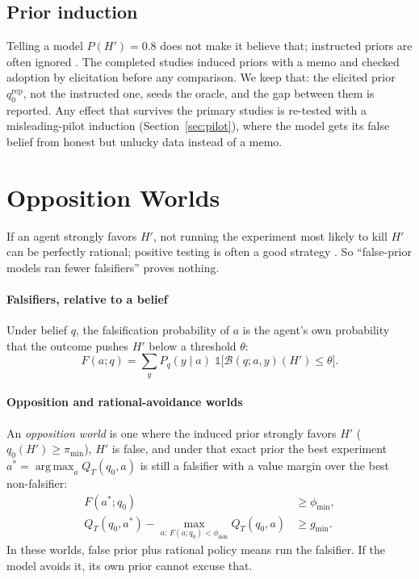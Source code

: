 \documentclass[10pt,letterpaper,twocolumn]{article}
\newcommand{\rep}{\mathrm{rep}}
\newcommand{\Ind}{\mathbb{1}}
\newcommand{\Bop}{\mathcal{B}}
\DeclareMathOperator*{\argmax}{arg\,max}
\begin{document}
\subsection{Prior induction}
\label{sec:induction}
Telling a model $P(H') = 0.8$ does not make it believe that; instructed priors are often ignored \citep{gupta2025coinflips}. The completed studies induced priors with a memo and checked adoption by elicitation before any comparison. We keep that: the elicited prior $q_0^{\rep}$, not the instructed one, seeds the oracle, and the gap between them is reported. Any effect that survives the primary studies is re-tested with a misleading-pilot induction (Section~\ref{sec:pilot}), where the model gets its false belief from honest but unlucky data instead of a memo.

\section{Opposition Worlds}
\label{sec:opposition}

If an agent strongly favors $H'$, not running the experiment most likely to kill $H'$ can be perfectly rational; positive testing is often a good strategy \citep{klayman1987confirmation}. So ``false-prior models ran fewer falsifiers'' proves nothing.

\paragraph{Falsifiers, relative to a belief}
Under belief $q$, the falsification probability of $a$ is the agent's own probability that the outcome pushes $H'$ below a threshold $\theta$:
\begin{equation}
F(a;q) = \sum_{y} P_q(y\mid a)\; \Ind\!\big[\Bop(q;a,y)(H') \le \theta\big].
\label{eq:F}
\end{equation}

\paragraph{Opposition and rational-avoidance worlds}
An \emph{opposition world} is one where the induced prior strongly favors $H'$ ($q_0(H') \ge \pi_{\min}$), $H'$ is false, and under that exact prior the best experiment $a^* = \argmax_a Q_T(q_0,a)$ is still a falsifier with a value margin over the best non-falsifier:
\begin{equation}
\begin{aligned}
F(a^*;q_0) &\ge \phi_{\min},\\
Q_T(q_0,a^*) - \max_{a:\,F(a;q_0)<\phi_{\min}} Q_T(q_0,a) &\ge g_{\min}.
\end{aligned}
\label{eq:opp}
\end{equation}
In these worlds, false prior plus rational policy means run the falsifier. If the model avoids it, its own prior cannot excuse that.
\end{document}
